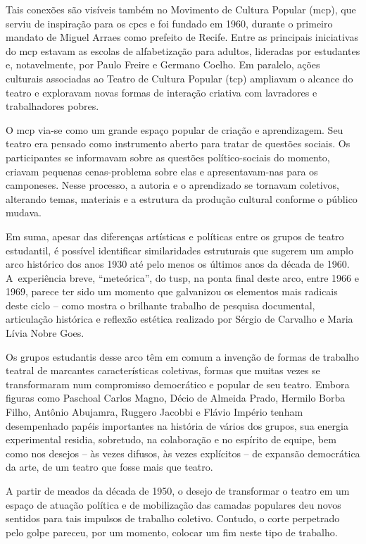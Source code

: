 Tais conexões são visíveis também no Movimento de Cultura Popular
({\sc mcp}), que serviu de inspiração para os {\sc cpc}s e foi fundado em
1960, durante o primeiro mandato de Miguel Arraes como prefeito de
Recife. Entre as principais iniciativas do {\sc mcp} estavam as escolas de
alfabetização para adultos, lideradas por estudantes e, notavelmente,
por Paulo Freire e Germano Coelho. Em paralelo, ações culturais
associadas ao Teatro de Cultura Popular ({\sc tcp}) ampliavam o alcance do
teatro e exploravam novas formas de interação criativa com lavradores e
trabalhadores pobres.

O {\sc mcp} via-se como um grande espaço popular de criação e aprendizagem.
Seu teatro era pensado como instrumento aberto para tratar de questões
sociais. Os participantes se informavam sobre as questões
político-sociais do momento, criavam pequenas cenas-problema sobre elas
e apresentavam-nas para os camponeses. Nesse processo, a autoria e o
aprendizado se tornavam coletivos, alterando temas, materiais e a
estrutura da produção cultural conforme o público mudava.

\subject{Arco histórico}

Em suma, apesar das diferenças artísticas e políticas entre os grupos de
teatro estudantil, é possível identificar similaridades estruturais que
sugerem um amplo arco histórico dos anos 1930 até pelo menos os últimos
anos da década de 1960. A~experiência breve, “meteórica”, do {\sc tusp}, na
ponta final deste arco, entre 1966 e 1969, parece ter sido um momento
que galvanizou os elementos mais radicais deste ciclo -- como mostra o
brilhante trabalho de pesquisa documental, articulação histórica e
reflexão estética realizado por Sérgio de Carvalho e Maria Lívia Nobre
Goes.

Os grupos estudantis desse arco têm em comum a invenção de formas de
trabalho teatral de marcantes características coletivas, formas que
muitas vezes se transformaram num compromisso democrático e popular de seu
teatro. Embora figuras como Paschoal Carlos Magno, Décio de Almeida
Prado, Hermilo Borba Filho, Antônio Abujamra, Ruggero Jacobbi e Flávio
Império tenham desempenhado papéis importantes na história de
vários dos grupos, sua energia experimental residia, sobretudo, na
colaboração e no espírito de equipe, bem como nos desejos -- às vezes
difusos, às vezes explícitos -- de expansão democrática da arte, de um
teatro que fosse mais que teatro.

A partir de meados da década de 1950, o desejo de transformar o teatro
em um espaço de atuação política e de mobilização das camadas populares
deu novos sentidos para tais impulsos de trabalho coletivo. Contudo, o
corte perpetrado pelo golpe pareceu, por um momento, colocar um fim
neste tipo de trabalho.

